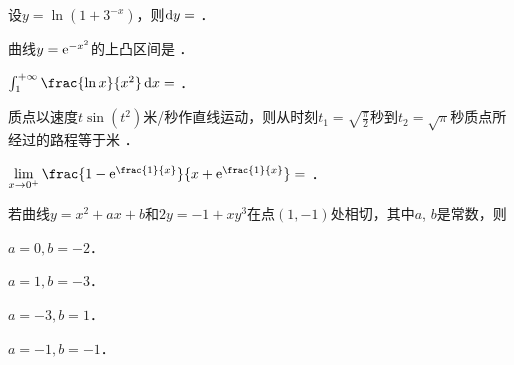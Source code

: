 \documentclass[plain,noanswer,medmath]{../../template/jnuexam}
\begin{document}






\begin{problem}
设$y = \ln(1 + 3^{- x})$，则$\mathop{}\!\mathrm{d} y =$ \fillin{}．
\end{problem}


\begin{problem}
曲线$y = \mathrm{e}^{-x^2}$的上凸区间是 \fillin{}．
\end{problem}


\begin{problem}
$\int_1^{+\infty} \frac{\ln x}{x^2} \dx =$ \fillin{}．
\end{problem}


\begin{problem}
质点以速度$t\sin(t^2)$米/秒作直线运动，则从时刻$t_1 = \sqrt{\frac{\pi}{2}}$秒到$t_2 = \sqrt{\pi}$秒质点所经过的路程等于米 \fillin{}．
\end{problem}


\begin{problem}
$\lim_{x \to 0^+} \frac{1-\e^{\frac{1}{x}}}{x+\e^{\frac{1}{x}}}=$ \fillin{}．
\end{problem}




\begin{problem}
若曲线$y = x^2 + ax + b$和$2y = - 1 + xy^3$在点$(1, -1)$处相切，其中$a$, $b$是常数，则\pickout{}
\begin{abcd}
\item $a = 0,b = - 2$．		
\item $a = 1,b = - 3$．
\item $a = - 3,b = 1$．		
\item $a = - 1,b = - 1$．
\end{abcd}
\end{problem}
\end{document}
